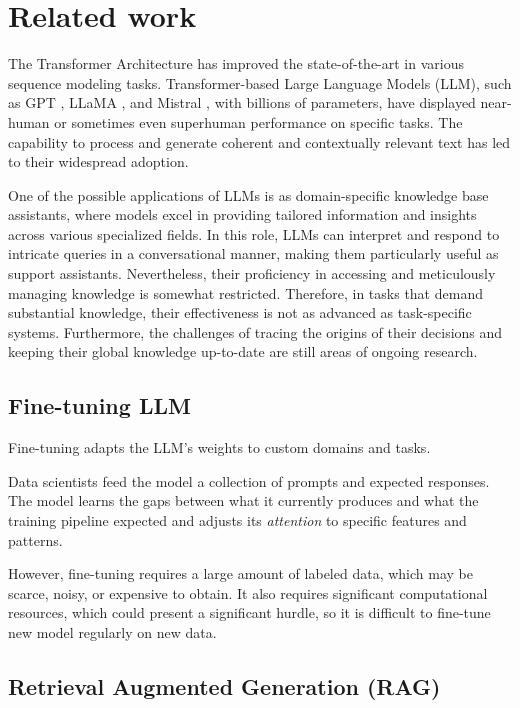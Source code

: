 \documentclass[conference, 11pt]{IEEEtran}
\begin{document}
\section{Related work}
The Transformer Architecture \cite{attention_is_all_you_need} has improved the state-of-the-art in various sequence modeling tasks. Transformer-based Large Language Models (LLM), such as GPT \cite{gpt}, LLaMA \cite{llama}, and Mistral \cite{mistral}, with billions of parameters, have displayed near-human or sometimes even superhuman performance on specific tasks. The capability to process and generate coherent and contextually relevant text has led to their widespread adoption.

One of the possible applications of LLMs is as domain-specific knowledge base assistants, where models excel in providing tailored information and insights across various specialized fields. In this role, LLMs can interpret and respond to intricate queries in a conversational manner, making them particularly useful as support assistants. Nevertheless, their proficiency in accessing and meticulously managing knowledge is somewhat restricted. Therefore, in tasks that demand substantial knowledge, their effectiveness is not as advanced as task-specific systems. Furthermore, the challenges of tracing the origins of their decisions and keeping their global knowledge up-to-date are still areas of ongoing research.

\subsection{Fine-tuning LLM}
Fine-tuning adapts the LLM's weights to custom domains and tasks.

Data scientists feed the model a collection of prompts and expected responses. The model learns the gaps between what it currently produces and what the training pipeline expected and adjusts its \emph{attention} to specific features and patterns.

However, fine-tuning requires a large amount of labeled data, which may be scarce, noisy, or expensive to obtain. It also requires significant computational resources, which could present a significant hurdle, so it is difficult to fine-tune new model regularly on new data.

\subsection{Retrieval Augmented Generation (RAG)}
\end{document}
